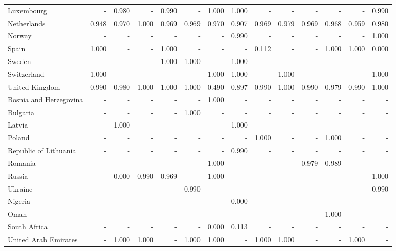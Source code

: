 \documentclass[10pt,twocolumn]{sig-alternate}
\begin{document}
\begin{table*}[t]
\begin{adjustbox}{width=1\textwidth}
\begin{tabular}{@{}ld{3.2}d{3.2}d{3.2}d{3.2}d{3.2}d{3.2}d{3.2}d{3.2}d{3.2}d{3.2}d{3.2}d{3.2}d{3.2}@{}}
Luxembourg  & -  & 0.980 & -  & 0.990 & -  & 1.000 & 1.000 & -  & -  & -  & -  & -  & 0.990\\
Netherlands  & 0.948 & 0.970 & 1.000 & 0.969 & 0.969 & 0.970 & 0.907 & 0.969 & 0.979 & 0.969 & 0.968 & 0.959 & 0.980\\
Norway  & -  & -  & -  & -  & -  & -  & 0.990 & -  & -  & -  & -  & -  & 1.000\\
Spain  & 1.000 & -  & -  & 1.000 & -  & -  & -  & 0.112 & -  & -  & 1.000 & 1.000 & 0.000\\
Sweden  & -  & -  & -  & 1.000 & 1.000 & -  & 1.000 & -  & -  & -  & -  & -  & - \\
Switzerland  & 1.000 & -  & -  & -  & -  & 1.000 & 1.000 & -  & 1.000 & -  & -  & -  & 1.000\\
United Kingdom  & 0.990 & 0.980 & 1.000 & 1.000 & 1.000 & 0.490 & 0.897 & 0.990 & 1.000 & 0.990 & 0.979 & 0.990 & 1.000\\ \hline
Bosnia and Herzegovina  & -  & -  & -  & -  & -  & 1.000 & -  & -  & -  & -  & -  & -  & - \\
Bulgaria  & -  & -  & -  & -  & 1.000 & -  & -  & -  & -  & -  & -  & -  & - \\
Latvia  & -  & 1.000 & -  & -  & -  & -  & 1.000 & -  & -  & -  & -  & -  & - \\
Poland  & -  & -  & -  & -  & -  & -  & -  & 1.000 & -  & -  & 1.000 & -  & - \\
Republic of Lithuania  & -  & -  & -  & -  & -  & -  & 0.990 & -  & -  & -  & -  & -  & - \\
Romania  & -  & -  & -  & -  & -  & 1.000 & -  & -  & -  & 0.979 & 0.989 & -  & - \\
Russia  & -  & 0.000 & 0.990 & 0.969 & -  & 1.000 & -  & -  & -  & -  & -  & -  & 1.000\\
Ukraine  & -  & -  & -  & -  & 0.990 & -  & -  & -  & -  & -  & -  & -  & 0.990\\ \hline
Nigeria  & -  & -  & -  & -  & -  & -  & 0.000 & -  & -  & -  & -  & -  & - \\
Oman  & -  & -  & -  & -  & -  & -  & -  & -  & -  & -  & 1.000 & -  & - \\
South Africa  & -  & -  & -  & -  & -  & 0.000 & 0.113 & -  & -  & -  & -  & -  & - \\
United Arab Emirates  & -  & 1.000 & 1.000 & -  & 1.000 & 1.000 & -  & 1.000 & 1.000 & -  & -  & 1.000 & - \\ \hline

\end{tabular}
\end{adjustbox}
\end{table*}
\end{document}
